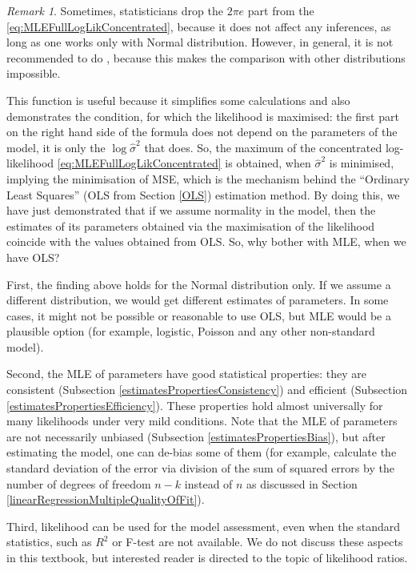 \documentclass[
]{book}
\theoremstyle{definition}
\theoremstyle{definition}
\theoremstyle{definition}
\theoremstyle{definition}
\theoremstyle{remark}
\newtheorem*{remark}{Remark}
\begin{document}
\begin{remark}
Sometimes, statisticians drop the \(2 \pi e\) part from the \eqref{eq:MLEFullLogLikConcentrated}, because it does not affect any inferences, as long as one works only with Normal distribution. However, in general, it is not recommended to do \citep{Burnham2004}, because this makes the comparison with other distributions impossible.
\end{remark}

This function is useful because it simplifies some calculations and also demonstrates the condition, for which the likelihood is maximised: the first part on the right hand side of the formula does not depend on the parameters of the model, it is only the \(\log \hat{\sigma}^2\) that does. So, the maximum of the concentrated log-likelihood \eqref{eq:MLEFullLogLikConcentrated} is obtained, when \(\hat{\sigma}^2\) is minimised, implying the minimisation of MSE, which is the mechanism behind the ``Ordinary Least Squares'' (OLS from Section \ref{OLS}) estimation method. By doing this, we have just demonstrated that if we assume normality in the model, then the estimates of its parameters obtained via the maximisation of the likelihood coincide with the values obtained from OLS. So, why bother with MLE, when we have OLS?

First, the finding above holds for the Normal distribution only. If we assume a different distribution, we would get different estimates of parameters. In some cases, it might not be possible or reasonable to use OLS, but MLE would be a plausible option (for example, logistic, Poisson and any other non-standard model).

Second, the MLE of parameters have good statistical properties: they are consistent (Subsection \ref{estimatesPropertiesConsistency}) and efficient (Subsection \ref{estimatesPropertiesEfficiency}). These properties hold almost universally for many likelihoods under very mild conditions. Note that the MLE of parameters are not necessarily unbiased (Subsection \ref{estimatesPropertiesBias}), but after estimating the model, one can de-bias some of them (for example, calculate the standard deviation of the error via division of the sum of squared errors by the number of degrees of freedom \(n-k\) instead of \(n\) as discussed in Section \ref{linearRegressionMultipleQualityOfFit}).

Third, likelihood can be used for the model assessment, even when the standard statistics, such as \(R^2\) or F-test are not available. We do not discuss these aspects in this textbook, but interested reader is directed to the topic of likelihood ratios.
\end{document}

